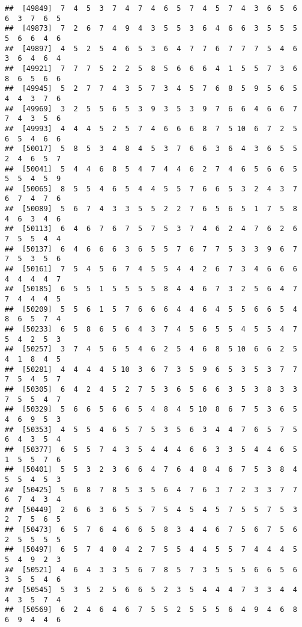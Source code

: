 \documentclass[
]{book}
\begin{document}
\begin{verbatim}
##  [49849]  7  4  5  3  7  4  7  4  6  5  7  4  5  7  4  3  6  5  6  6  3  7  6  5
##  [49873]  7  2  6  7  4  9  4  3  5  5  3  6  4  6  6  3  5  5  5  5  6  6  4  6
##  [49897]  4  5  2  5  4  6  5  3  6  4  7  7  6  7  7  7  5  4  6  3  6  4  6  4
##  [49921]  7  7  7  5  2  2  5  8  5  6  6  6  4  1  5  5  7  3  6  8  6  5  6  6
##  [49945]  5  2  7  7  4  3  5  7  3  4  5  7  6  8  5  9  5  6  5  4  4  3  7  6
##  [49969]  3  2  5  5  6  5  3  9  3  5  3  9  7  6  6  4  6  6  7  7  4  3  5  6
##  [49993]  4  4  4  5  2  5  7  4  6  6  6  8  7  5 10  6  7  2  5  6  5  4  6  6
##  [50017]  5  8  5  3  4  8  4  5  3  7  6  6  3  6  4  3  6  5  5  2  4  6  5  7
##  [50041]  5  4  4  6  8  5  4  7  4  4  6  2  7  4  6  5  6  6  5  5  5  4  5  9
##  [50065]  8  5  5  4  6  5  4  4  5  5  7  6  6  5  3  2  4  3  7  6  7  4  7  6
##  [50089]  5  6  7  4  3  3  5  5  2  2  7  6  5  6  5  1  7  5  8  4  6  3  4  6
##  [50113]  6  4  6  7  6  7  5  7  5  3  7  4  6  2  4  7  6  2  6  7  5  5  4  4
##  [50137]  6  4  6  6  6  3  6  5  5  7  6  7  7  5  3  3  9  6  7  7  5  3  5  6
##  [50161]  7  5  4  5  6  7  4  5  5  4  4  2  6  7  3  4  6  6  6  4  4  4  4  7
##  [50185]  6  5  5  1  5  5  5  5  8  4  4  6  7  3  2  5  6  4  7  7  4  4  4  5
##  [50209]  5  5  6  1  5  7  6  6  6  4  4  6  4  5  5  6  6  5  4  8  6  5  7  4
##  [50233]  6  5  8  6  5  6  4  3  7  4  5  6  5  5  4  5  5  4  7  5  4  2  5  3
##  [50257]  3  7  4  5  6  5  4  6  2  5  4  6  8  5 10  6  6  2  5  4  1  8  4  5
##  [50281]  4  4  4  4  5 10  3  6  7  3  5  9  6  5  3  5  3  7  7  7  5  4  5  7
##  [50305]  6  4  2  4  5  2  7  5  3  6  5  6  6  3  5  3  8  3  3  7  5  5  4  7
##  [50329]  5  6  6  5  6  6  5  4  8  4  5 10  8  6  7  5  3  6  5  4  6  9  5  3
##  [50353]  4  5  5  4  6  5  7  5  3  5  6  3  4  4  7  6  5  7  5  6  4  3  5  4
##  [50377]  6  5  5  7  4  3  5  4  4  4  6  6  3  3  5  4  4  6  5  1  5  5  7  6
##  [50401]  5  5  3  2  3  6  6  4  7  6  4  8  4  6  7  5  3  8  4  5  5  4  5  3
##  [50425]  5  6  8  7  8  5  3  5  6  4  7  6  3  7  2  3  3  7  7  6  7  4  3  4
##  [50449]  2  6  6  3  6  5  5  7  5  4  5  4  5  7  5  5  7  5  3  2  7  5  6  5
##  [50473]  6  5  7  6  4  6  6  5  8  3  4  4  6  7  5  6  7  5  6  2  5  5  5  5
##  [50497]  6  5  7  4  0  4  2  7  5  5  4  4  5  5  7  4  4  4  5  5  4  9  2  3
##  [50521]  4  6  4  3  3  5  6  7  8  5  7  3  5  5  5  6  6  5  6  3  5  5  4  6
##  [50545]  5  3  5  2  5  6  6  5  2  3  5  4  4  4  7  3  3  4  4  4  3  5  7  4
##  [50569]  6  2  4  6  4  6  7  5  5  2  5  5  5  6  4  9  4  6  8  6  9  4  4  6

\end{verbatim}
\end{document}
